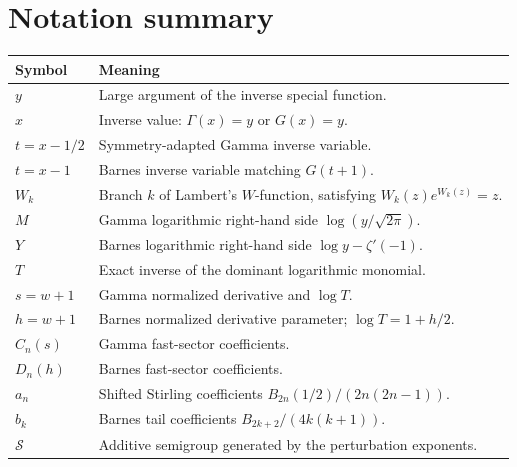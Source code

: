 \documentclass[11pt]{article}
\theoremstyle{definition}
\theoremstyle{remark}
\newcommand{\calS}{\mathcal S}
\begin{document}
\section{Notation summary}\label{app:notation}

\begin{longtable}{@{}p{}p{}@{}}
\toprule
Symbol & Meaning\\
\midrule
\endhead
\(y\) & Large argument of the inverse special function.\\
\(x\) & Inverse value: \(\Gamma(x)=y\) or \(G(x)=y\).\\
\(t=x-1/2\) & Symmetry-adapted Gamma inverse variable.\\
\(t=x-1\) & Barnes inverse variable matching \(G(t+1)\).\\
\(W_k\) & Branch \(k\) of Lambert's \(W\)-function, satisfying \(W_k(z)e^{W_k(z)}=z\).\\
\(M\) & Gamma logarithmic right-hand side \(\log(y/\sqrt{2\pi})\).\\
\(Y\) & Barnes logarithmic right-hand side \(\log y-\zeta'(-1)\).\\
\(T\) & Exact inverse of the dominant logarithmic monomial.\\
\(s=w+1\) & Gamma normalized derivative and \(\log T\).\\
\(h=w+1\) & Barnes normalized derivative parameter; \(\log T=1+h/2\).\\
\(C_n(s)\) & Gamma fast-sector coefficients.\\
\(D_n(h)\) & Barnes fast-sector coefficients.\\
\(a_n\) & Shifted Stirling coefficients \(B_{2n}(1/2)/(2n(2n-1))\).\\
\(b_k\) & Barnes tail coefficients \(B_{2k+2}/(4k(k+1))\).\\
\(\calS\) & Additive semigroup generated by the perturbation exponents.\\
\bottomrule
\end{longtable}
\end{document}
